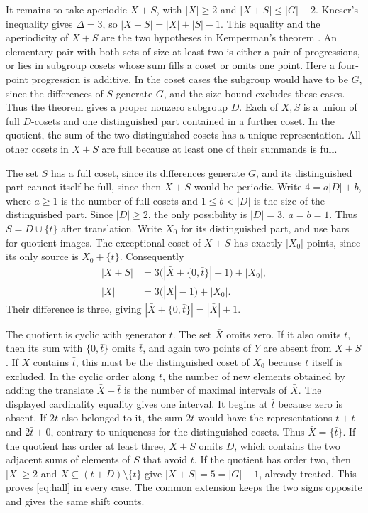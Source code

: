 \documentclass[11pt,reqno]{amsart}
\theoremstyle{remark}
\numberwithin{equation}{section}
\begin{document}
It remains to take aperiodic \(X+S\), with \(|X|\ge2\) and \(|X+S|\le
|G|-2\). Kneser's inequality gives \(\Delta=3\), so
\(|X+S|=|X|+|S|-1\). This equality and the aperiodicity of
\(X+S\) are the two hypotheses in Kemperman's theorem
\cite[Theorem C]{Lev}. An elementary pair with
both sets of size at least two is either a pair of progressions, or lies
in subgroup cosets whose sum fills a coset or omits one point. Here a
four-point progression is additive. In the coset cases the subgroup would
have to be \(G\), since the differences of \(S\) generate \(G\), and the
size bound excludes these cases. Thus the theorem gives a proper nonzero
subgroup \(D\). Each of \(X,S\) is a union of full \(D\)-cosets and one
distinguished part contained in a further coset. In the quotient, the sum
of the two distinguished cosets has a unique representation. All other
cosets in \(X+S\) are full because at least one of their summands is
full.

The set \(S\) has a full coset, since its differences generate \(G\), and
its distinguished part cannot itself be full, since then \(X+S\) would be
periodic. Write \(4=a|D|+b\), where \(a\ge1\) is the number
of full cosets and \(1\le b<|D|\) is the size of the
distinguished part. Since \(|D|\ge2\), the only possibility is
\(|D|=3\), \(a=b=1\). Thus \(S=D\cup\{t\}\) after
translation. Write \(X_0\) for its distinguished part, and use bars
for quotient images. The exceptional coset of \(X+S\) has exactly
\(|X_0|\) points, since its only source is \(X_0+\{t\}\). Consequently
\[
 \begin{split}
 |X+S|&=3\bigl(|\bar X+\{0,\bar t\}|-1\bigr)+|X_0|,\\
 |X|&=3\bigl(|\bar X|-1\bigr)+|X_0|.
 \end{split}
\]
Their difference is three, giving \(|\bar X+\{0,\bar t\}|=|\bar X|+1\).

The quotient is cyclic with generator \(\bar t\). The set \(\bar X\)
omits zero. If it also omits \(\bar t\), then its sum with \(\{0,\bar
t\}\) omits \(\bar t\), and again two points of \(Y\) are absent from
\(X+S\). If \(\bar X\) contains \(\bar t\), this must be the
distinguished coset of \(X_0\) because \(t\) itself is excluded. In the
cyclic order along \(\bar t\), the number of new elements obtained by
adding the translate \(\bar X+\bar t\) is the number of maximal intervals
of \(\bar X\). The displayed cardinality equality gives one interval. It
begins at \(\bar t\) because zero is absent. If \(2\bar t\) also belonged
to it, the sum \(2\bar t\) would have the representations \(\bar t+\bar
t\) and \(2\bar t+0\), contrary to uniqueness for the distinguished
cosets. Thus \(\bar X=\{\bar t\}\). If the quotient has order at least
three, \(X+S\) omits \(D\), which contains the two adjacent sums of
elements of \(S\) that avoid \(t\). If the quotient has order two, then
\(|X|\ge2\) and \(X\subseteq(t+D)\setminus\{t\}\) give \(|X+S|=5=|G|-1\),
already treated. This proves \eqref{eq:hall} in every case. The common
extension keeps the two signs opposite and gives the same shift counts.
\end{document}
